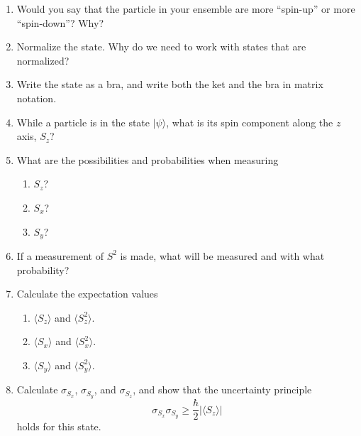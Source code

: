 \documentclass[10pt, letterpaper, twoside, openany]{article}
\newcommand{\ket}[1]{| #1 \rangle}
\newcommand{\avg}[1]{\langle #1 \rangle}
\begin{document}
\begin{enumerate}
\item Would you say that the particle in your ensemble are more ``spin-up'' or more ``spin-down''?  Why?

\vspace{1in}

\item Normalize the state.  Why do we need to work with states that are normalized?

\vspace{2in}

\item Write the state as a bra, and write both the ket and the bra in matrix notation.

\newpage

\item While a particle is in the state $\ket{\psi}$, what is its spin component along the $z$ axis, $S_z$?  

\vspace{1.5in}

\item What are the possibilities and probabilities when measuring 
\begin{enumerate}
\item $S_z$?

\vspace{1.5in}

\item $S_x$?

\vspace{2.5in}

\item $S_y$?


\end{enumerate}

\newpage

\item If a measurement of $S^2$ is made, what will be measured and with what probability?

\vspace{2in}

\item Calculate the expectation values
\begin{enumerate}
\item $\avg{S_z}$ and $\avg{S_z^2}$.

\vspace{3in}

\item $\avg{S_x}$ and $\avg{S_x^2}$.

\newpage

\item $\avg{S_y}$ and $\avg{S_y^2}$.
\end{enumerate}

\vspace{3in}

\item Calculate $\sigma_{S_x}$, $\sigma_{S_y}$, and $\sigma_{S_z}$, and show that the uncertainty principle 
\[
\sigma_{S_x} \sigma_{S_y} \ge \frac{\hbar}{2} | \avg{S_z} |
\]
holds for this state.

\end{enumerate}
\end{document}
